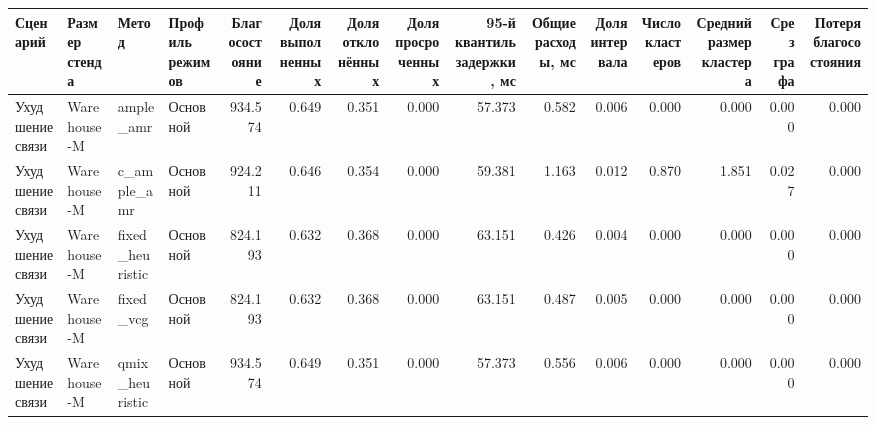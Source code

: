 \begin{tabular}{llllrrrrrrrrrrr}
\toprule
 Сценарий & Размер стенда & Метод & Профиль режимов & Благосостояние & Доля выполненных & Доля отклонённых & Доля просроченных & 95-й квантиль задержки, мс & Общие расходы, мс & Доля интервала & Число кластеров & Средний размер кластера & Срез графа & Потеря благосостояния \\
\midrule
 Ухудшение связи & Warehouse-M & ample_amr & Основной & 934.574 & 0.649 & 0.351 & 0.000 & 57.373 & 0.582 & 0.006 & 0.000 & 0.000 & 0.000 & 0.000 \\
 Ухудшение связи & Warehouse-M & c_ample_amr & Основной & 924.211 & 0.646 & 0.354 & 0.000 & 59.381 & 1.163 & 0.012 & 0.870 & 1.851 & 0.027 & 0.000 \\
 Ухудшение связи & Warehouse-M & fixed_heuristic & Основной & 824.193 & 0.632 & 0.368 & 0.000 & 63.151 & 0.426 & 0.004 & 0.000 & 0.000 & 0.000 & 0.000 \\
 Ухудшение связи & Warehouse-M & fixed_vcg & Основной & 824.193 & 0.632 & 0.368 & 0.000 & 63.151 & 0.487 & 0.005 & 0.000 & 0.000 & 0.000 & 0.000 \\
 Ухудшение связи & Warehouse-M & qmix_heuristic & Основной & 934.574 & 0.649 & 0.351 & 0.000 & 57.373 & 0.556 & 0.006 & 0.000 & 0.000 & 0.000 & 0.000 \\
\bottomrule
\end{tabular}

